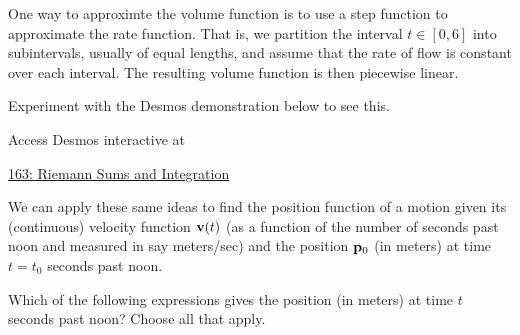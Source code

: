\documentclass{ximera}
\begin{document}
One way to approximte the volume function is to use a step function to approximate the rate function. That is, we partition the interval $t\in [0,6]$ into subintervals, usually of equal lengths, and assume that the rate of flow is constant over each interval. The resulting volume function is then piecewise linear. 

Experiment with the Desmos demonstration below to see this.

Access Desmos interactive at
 
\href{https://https://www.desmos.com/calculator/zswxfftnnk}{163: Riemann Sums and Integration}

 
\begin{onlineOnly}
    \begin{center}
\end{center}
\end{onlineOnly}


We can apply these same ideas to find the position function of a motion given its (continuous) velocity function ${\bf v}(t)$ (as a function of the number of seconds past noon and measured in say meters/sec) and the position ${\bf p}_0$ (in meters) at time $t=t_0$ seconds past noon.  

\begin{question}    \label{Qedtrg78}
Which of the following expressions gives the position (in meters) at time $t$ seconds past noon? Choose all that apply.
\begin{selectAll}  
  \end{selectAll}
\end{question}
\end{document}

